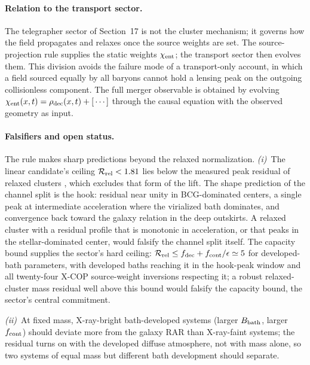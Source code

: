 \documentclass[11pt]{article}
\begin{document}
\paragraph{Relation to the transport sector.}
The telegrapher sector of Section~17 is not the cluster mechanism; it governs how the field propagates and relaxes once the source weights are set. The source-projection rule supplies the static weights $\chi_{\rm ent}$; the transport sector then evolves them. This division avoids the failure mode of a transport-only account, in which a field sourced equally by all baryons cannot hold a lensing peak on the outgoing collisionless component. The full merger observable is obtained by evolving $\chi_{\rm ent}(x,t)=\rho_{\rm dec}(x,t)+[\,\cdots]$ through the causal equation with the observed geometry as input.

\paragraph{Falsifiers and open status.}
The rule makes sharp predictions beyond the relaxed normalization. \emph{(i)}~The linear candidate's ceiling $\mathcal R_{\rm rel}<1.81$ lies below the measured peak residual of relaxed clusters \citep{Tian2020,Eckert2022}, which excludes that form of the lift. The shape prediction of the channel split is the hook: residual near unity in BCG-dominated centers, a single peak at intermediate acceleration where the virialized bath dominates, and convergence back toward the galaxy relation in the deep outskirts. A relaxed cluster with a residual profile that is monotonic in acceleration, or that peaks in the stellar-dominated center, would falsify the channel split itself. The capacity bound supplies the sector's hard ceiling: $\mathcal R_{\rm rel}\le f_{\rm dec}+f_{\rm cont}/\epsilon\simeq5$ for developed-bath parameters, with developed baths reaching it in the hook-peak window and all twenty-four X-COP source-weight inversions respecting it; a robust relaxed-cluster mass residual well above this bound would falsify the capacity bound, the sector's central commitment.

\emph{(ii)}~At fixed mass, X-ray-bright bath-developed systems (larger $B_{\rm bath}$, larger $f_{\rm cont}$) should deviate more from the galaxy RAR than X-ray-faint systems; the residual turns on with the developed diffuse atmosphere, not with mass alone, so two systems of equal mass but different bath development should separate.
\end{document}
